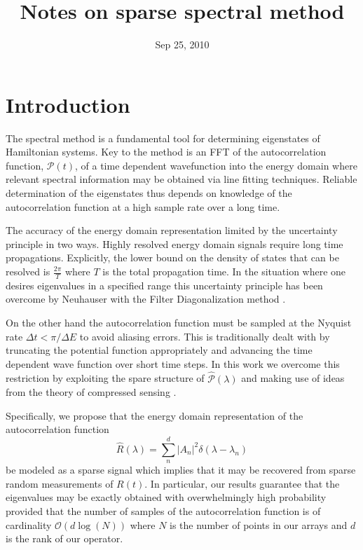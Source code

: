 \documentclass[10pt]{amsart}
\title{Notes on sparse spectral method}
\date{Sep 25, 2010}
\theoremstyle{remark}
\begin{document}
\maketitle


\section{Introduction}

The spectral method is a fundamental tool for determining eigenstates of Hamiltonian systems. Key to the method is an FFT of the autocorrelation function, $\mathcal{P}(t)$, of a time dependent wavefunction into the energy domain where relevant spectral information may be obtained via line fitting techniques. Reliable determination of the eigenstates thus depends on knowledge of the autocorrelation function at a high sample rate over a long time.

The accuracy of the energy domain representation limited by the uncertainty principle in two ways. Highly resolved energy domain signals require long time propagations. Explicitly, the lower bound on the density of states that can be resolved is $\frac{2 \pi}{T}$ where $T$ is the total propagation time. In the situation where one desires eigenvalues in a specified range this uncertainty principle has been overcome by Neuhauser with the Filter Diagonalization method \cite{Wall1995} \cite{Neuhauser1994} \cite{Mandelshtam2001}.

On the other hand the autocorrelation function must be sampled at the Nyquist rate $ \Delta t < \pi / \Delta E $ to avoid aliasing errors. This is traditionally dealt with by truncating the potential function appropriately and advancing the time dependent wave function over short time steps. In this work we overcome this restriction by exploiting the spare structure of $\hat{\mathcal{P}}(\lambda)$ and making use of ideas from the theory of compressed sensing \cite{Candes2006}.

Specifically, we propose that the energy domain representation of the autocorrelation function
\begin{equation}
\hat{R}(\lambda) = \sum_n^d |A_n|^2 \delta(\lambda-\lambda_n)
\end{equation}
be modeled as a sparse signal which implies that it may be recovered from sparse random measurements of $R(t)$. In particular, our results guarantee that the eigenvalues may be exactly obtained with overwhelmingly high probability provided that the number of samples of the autocorrelation function is of cardinality $\mathcal{O}(d \log(N))$ where $N$ is the number of points in our arrays and $d$ is the rank of our operator.
\end{document}
